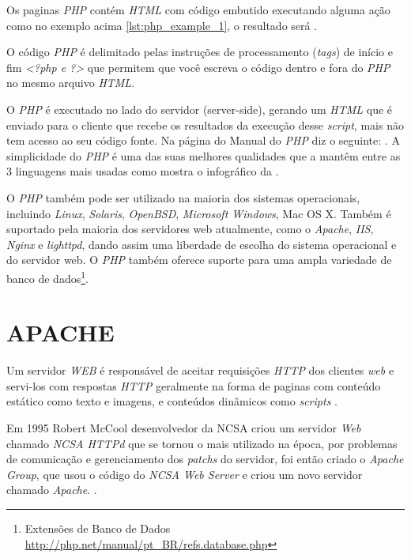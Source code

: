 Os paginas \textit{PHP} contém \textit{HTML} com código embutido executando alguma ação como no exemplo acima \ref{lst:php_example_1}, o resultado será .

O código \textit{PHP} é delimitado pelas instruções de processamento (\textit{tags}) de início e fim \textit{<?php e ?>} que permitem que você escreva o código dentro e fora do \textit{PHP} no mesmo arquivo \textit{HTML}. \cite{php-intro}

O \textit{PHP} é executado no lado do servidor (server-side), gerando um \textit{HTML} que é enviado para o cliente que recebe os resultados da execução desse \textit{script}, mais não tem acesso ao seu código fonte. Na página do Manual do \textit{PHP} diz o seguinte:  . A simplicidade do \textit{PHP} é uma das suas melhores qualidades que a mantêm entre as 3 linguagens mais usadas como mostra o infográfico da .

O \textit{PHP} também pode ser utilizado na maioria dos sistemas operacionais, incluindo \textit{Linux}, \textit{Solaris}, \textit{OpenBSD}, \textit{Microsoft Windows}, Mac OS X. Também é suportado pela maioria dos servidores web atualmente, como o \textit{Apache}, \textit{IIS}, \textit{Nginx} e \textit{lighttpd}, dando assim uma liberdade de escolha do sistema operacional e do servidor web. O \textit{PHP} também oferece suporte para uma ampla variedade de banco de dados\footnote{Extensões de Banco de Dados \url{http://php.net/manual/pt_BR/refs.database.php}}.


\section{APACHE}
\label{sec:apache}

Um servidor \textit{WEB} é responsável de aceitar requisições \textit{HTTP} dos clientes \textit{web} e servi-los com respostas \textit{HTTP} geralmente na forma de paginas com conteúdo estático como texto e imagens, e conteúdos dinâmicos como \textit{scripts} \cite[p.~15]{igor}.

Em 1995 Robert McCool desenvolvedor da \ac{NCSA} criou um servidor \textit{Web} chamado \textit{NCSA HTTPd} que se tornou o mais utilizado na época, por problemas de comunicação e gerenciamento dos \textit{patchs} do servidor, foi então criado o \textit{Apache Group}, que usou o código do \textit{NCSA Web Server} e criou um novo servidor chamado \textit{Apache}. \cite[p.~36]{kabir}.

